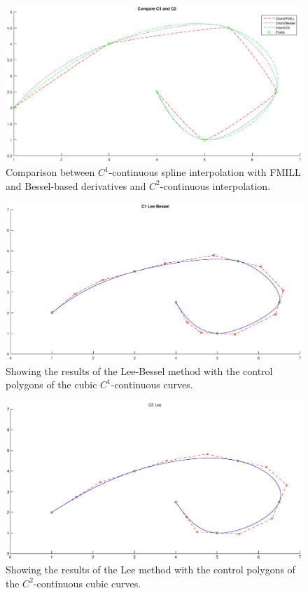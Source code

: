 \documentclass[12pt,a4paper]{article}
\begin{document}
\begin{figure}[hbtp]
\centering
\includegraphics[width=\textwidth]{C1vsC2.eps}
\caption{Comparison  between  $C^1$-continuous spline interpolation with FMILL and Bessel-based derivatives and $C^2$-continuous interpolation.}
\label{fig:C1vsC2}
\end{figure}

\begin{figure}[hbtp]
\centering
\includegraphics[width=\textwidth]{C1-LeeBessel.eps}
\caption{Showing the results of the Lee-Bessel method with the control polygons of the cubic  $C^1$-continuous curves.}
\label{fig:C1-LeeBessel}
\end{figure}

\begin{figure}[hbtp]
\centering
\includegraphics[width=\textwidth]{C2Lee.eps}
\caption{Showing the results of the Lee method with the control polygons of the $C^2$-continuous cubic curves.}
\label{fig:C2-Lee}
\end{figure}
\end{document}
